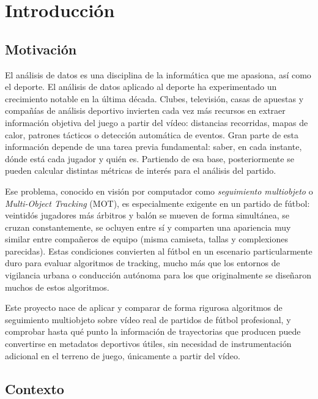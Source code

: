 \chapter{Introducción}
\label{cap:introduccion}

\section{Motivación}
\label{sec:intro-motivacion}

El análisis de datos es una disciplina de la informática que me apasiona, así como
el deporte. El análisis de datos aplicado al deporte ha experimentado un crecimiento notable
en la última década. Clubes, televisión, casas de apuestas y compañías de análisis
deportivo invierten cada vez más recursos en extraer información objetiva del
juego a partir del vídeo: distancias recorridas, mapas de calor,
patrones tácticos o detección automática de eventos. Gran parte de esta
información depende de una tarea previa fundamental: saber, en cada instante,
dónde está cada jugador y quién es. Partiendo de esa base, posteriormente se
pueden calcular distintas métricas de interés para el análisis del partido.

Ese problema, conocido en visión por computador como \emph{seguimiento
multiobjeto} o \emph{Multi-Object Tracking} (MOT), es especialmente exigente
en un partido de fútbol: veintidós jugadores más árbitros y balón se mueven de
forma simultánea, se cruzan constantemente, se ocluyen entre sí y comparten
una apariencia muy similar entre compañeros de equipo (misma camiseta, tallas
y complexiones parecidas). Estas condiciones convierten al fútbol en un
escenario particularmente duro para evaluar algoritmos de tracking, mucho más
que los entornos de vigilancia urbana o conducción autónoma para los que
originalmente se diseñaron muchos de estos algoritmos.

Este proyecto nace de aplicar y comparar de forma rigurosa
algoritmos de seguimiento multiobjeto sobre vídeo real de partidos de fútbol
profesional, y comprobar hasta qué punto la información de trayectorias que
producen puede convertirse en metadatos deportivos útiles, sin necesidad de instrumentación adicional
en el terreno de juego, únicamente a partir del vídeo.

\section{Contexto}
\label{sec:intro-contexto}

